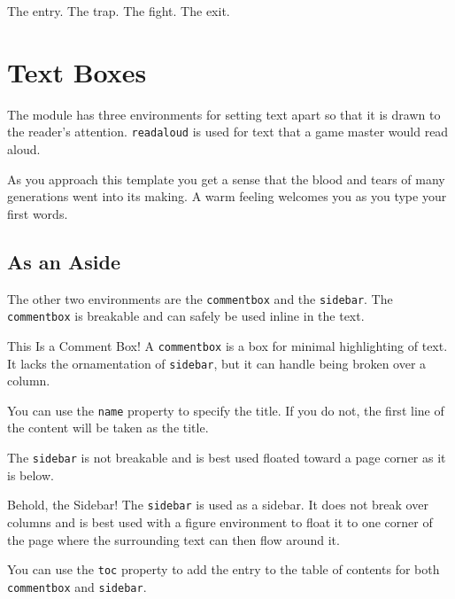 \documentclass[10pt,twoside,twocolumn,openany,bg=full,notitlepage,nodeprecatedcode]{dndbook}
\begin{document}
\label{sec:org982487d}
The entry.
\label{sec:org7f30ff7}
The trap.
\label{sec:orga9cd1f4}
The fight.
\label{sec:org57340a0}
The exit.
\chapter{Text Boxes}
\label{sec:org6b565cd}
The module has three environments for setting text apart so that it is drawn to the reader's attention. \texttt{readaloud} is used for text that a game master would read aloud.

\begin{DndReadAloud}
As you approach this template you get a sense that the blood and tears of many generations went into its making. A warm feeling welcomes you as you type your first words.
\end{DndReadAloud}
\section{As an Aside}
\label{sec:orgbbfe1f4}

The other two environments are the \texttt{commentbox} and the \texttt{sidebar}. The \texttt{commentbox} is breakable and can safely be used inline in the text.

\begin{DndComment}{This Is a Comment Box!}\label{This Is a Comment Box!}
A \texttt{commentbox} is a box for minimal highlighting of text. It lacks the ornamentation of \texttt{sidebar}, but it can handle being broken over a column.

You can use the \texttt{name} property to specify the title. If you do not, the first line of the content will be taken as the title.
\end{DndComment}

The \texttt{sidebar} is not breakable and is best used floated toward a page corner as it is below.

\begin{DndSidebar}[float=!h]{Behold, the Sidebar!}\label{Behold, the Sidebar!}
The \texttt{sidebar} is used as a sidebar. It does not break over columns and is best used with a figure environment to float it to one corner of the page where the surrounding text can then flow around it.

You can use the \texttt{toc} property to add the entry to the table of contents for both \texttt{commentbox} and \texttt{sidebar}.
\end{DndSidebar}
\end{document}

